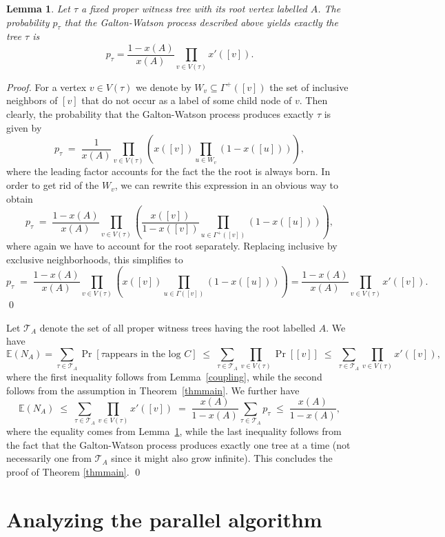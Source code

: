 \documentclass[11pt,a4paper]{article}
\newtheorem{lemma}[theorem]{Lemma}
\DeclareMathOperator*{\pr}{Pr}
\begin{document}
\begin{lemma}
\label{lemgwprob}
Let $\tau$ a fixed proper witness tree with its root vertex labelled $A$. The
probability $p_\tau$ that the Galton-Watson process described above yields
exactly the tree $\tau$ is
$$ p_\tau =  \frac{1-x(A)}{x(A)} \prod_{v \in V(\tau)}x'([v]).$$
\end{lemma}

\emph{Proof.} For a vertex $v \in V(\tau)$ we denote by $W_v \subseteq \Gamma^+([v])$ the set of inclusive neighbors
of $[v]$ that do not occur as a label of some child node of $v$. Then clearly, the probability that the Galton-Watson process produces exactly
$\tau$ is given by
$$ p_\tau \; = \; \frac{1}{x(A)} \prod_{v \in V(\tau)} \left( x([v]) \prod_{u \in W_v} (1-x([u])) \right), $$
where the leading factor accounts for the fact the the root is always born. In order to get rid of the $W_v$, we can rewrite this 
expression in an obvious way to obtain
$$ p_\tau \; = \; \frac{1-x(A)}{x(A)} \prod_{v \in V(\tau)} \left( \frac{x([v])}{1-x([v])} \prod_{u \in \Gamma^+([v])} (1-x([u])) \right), $$
where again we have to account for the root separately. Replacing inclusive by exclusive neighborhoods, this simplifies to
$$ p_\tau \; = \; \frac{1-x(A)}{x(A)} \prod_{v \in V(\tau)} \left( x([v]) \prod_{u \in \Gamma([v])} (1-x([u])) \right)=  \frac{1-x(A)}{x(A)} \prod_{v \in V(\tau)}x'([v]).$$
\qed

Let $\mathcal{T}_A$ denote the set of all proper witness trees having the root
labelled $A$. We have
$$ \mathbb{E}(N_A) = \sum_{\tau \in \mathcal{T}_A} \pr[\tau \mbox{
  appears in the log } C] \; \le \; \sum_{\tau \in \mathcal{T}_A}
  \prod_{v \in V(\tau)} \pr[[v]] \; \le \; \sum_{\tau\in
\mathcal{T}_A}\prod_{v\in V(\tau)}x'([v]),$$
where the first inequality follows from Lemma~\ref{coupling}, while the second
follows from the assumption in Theorem~\ref{thmmain}. We further have
$$\mathbb{E}(N_A)\;\le\;\sum_{\tau\in \mathcal{T}_A}\prod_{v\in
      V(\tau)}x'([v])\;=\;\frac{x(A)}{1-x(A)}\sum_{\tau\in\mathcal{T}_A}p_\tau\;\le\;\frac{x(A)}{1-x(A)},$$
where the equality comes from Lemma~\ref{lemgwprob}, while the last inequality
follows from the fact that the Galton-Watson process produces exactly one tree
at a time (not necessarily one from $\mathcal{T}_A$ since it might also grow
infinite). This concludes the proof of Theorem \ref{thmmain}. \qed

\section{Analyzing the parallel algorithm}
\end{document}
